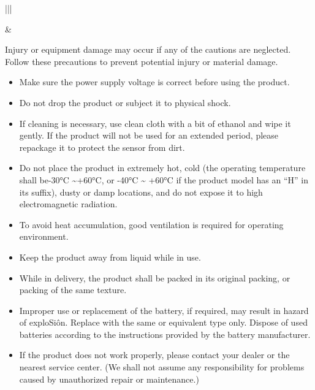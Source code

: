 \documentclass[letterpaper,10pt,english]{sphinxmanual}
\begin{document}
\begin{savenotes}\sphinxattablestart
\centering
\begin{tabular}[t]{|||}
\hline

\noindent{}
&
\\
\hline
\end{tabular}
\par
\sphinxattableend\end{savenotes}

 Injury or equipment damage may occur if any of the cautions are neglected. Follow these precautions to prevent potential injury or material damage.
\begin{itemize}
\item {} 
Make sure the power supply voltage is correct before using the product.

\item {} 
Do not drop the product or subject it to physical shock.

\item {} 
If cleaning is necessary, use clean cloth with a bit of ethanol and wipe it gently. If the product will not be used for an extended period, please repackage it to protect the sensor from dirt.

\item {} 
Do not place the product in extremely hot, cold (the operating temperature shall be-30°C \textasciitilde{}+60°C, or -40°C \textasciitilde{} +60°C if the product model has an “H” in its suffix), dusty or damp locations, and do not expose it to high electromagnetic radiation.

\item {} 
To avoid heat accumulation, good ventilation is required for operating environment.

\item {} 
Keep the product away from liquid while in use.

\item {} 
While in delivery, the product shall be packed in its original packing, or packing of the same texture.

\item {} 
Improper use or replacement of the battery, if required, may result in hazard of exploSiôn. Replace with the same or equivalent type only. Dispose of used batteries according to the instructions provided by the battery manufacturer.

\item {} 
If the product does not work properly, please contact your dealer or the nearest service center. (We shall not assume any responsibility for problems caused by unauthorized repair or maintenance.)

\end{itemize}
\end{document}
